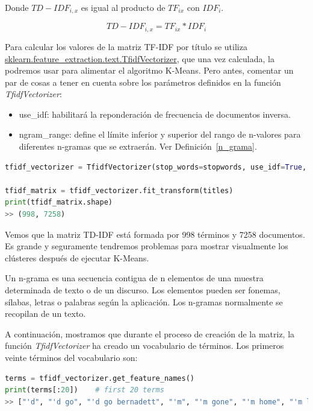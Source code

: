 \documentclass{uimppracticas}
\begin{document}
Donde $TD-IDF_{i,x}$ es igual al producto de $TF_{ix}$ con $IDF_{i}$.

\begin{equation}
	TD-IDF_{i,x} = TF_{ix} * IDF_{i}
\end{equation}

Para calcular los valores de la matriz TF-IDF por título se utiliza \href{https://scikit-learn.org/stable/modules/generated/sklearn.feature_extraction.text.TfidfVectorizer.html}{sklearn.feature\_extraction.text.TfidfVectorizer}, que una vez calculada, la podremos usar para alimentar el algoritmo K-Means. Pero antes, comentar un par de cosas a tener en cuenta sobre los parámetros definidos en la función \textit{TfidfVectorizer}:

\begin{itemize}
	\item use\_idf: habilitará la reponderación de frecuencia de documentos inversa.
	\item ngram\_range: define el límite inferior y superior del rango de n-valores para diferentes n-gramas que se extraerán. Ver Definición~\ref{n_grama}.
\end{itemize}

\begin{lstlisting}[language=python]
tfidf_vectorizer = TfidfVectorizer(stop_words=stopwords, use_idf=True, tokenizer=tokenize_and_stem, ngram_range=(1, 3))

tfidf_matrix = tfidf_vectorizer.fit_transform(titles)
print(tfidf_matrix.shape)
>> (998, 7258)
\end{lstlisting}

Vemos que la matriz TD-IDF está formada por 998 términos y 7258 documentos. Es grande y seguramente tendremos problemas para mostrar visualmente los clústeres después de ejecutar K-Means.

\begin{definition}\label{n_grama}
	Un n-grama es una secuencia contigua de n elementos de una muestra determinada de texto o de un discurso. Los elementos pueden ser fonemas, sílabas, letras o palabras según la aplicación. Los n-gramas normalmente se recopilan de un texto.
\end{definition}

A continuación, mostramos que durante el proceso de creación de la matriz, la función \textit{TfidfVectorizer} ha creado un vocabulario de términos. Los primeros veinte términos del vocabulario son:

\begin{lstlisting}[language=python]
terms = tfidf_vectorizer.get_feature_names()
print(terms[:20])    # first 20 terms
>> ["'d", "'d go", "'d go bernadett", "'m", "'m gone", "'m home", "'m lie", "'m lie tell", "'s", "'s alic", "'s alic wonderland", "'s astound", "'s astound stori", "'s autobiographi", "'s babi", "'s babi ice", "'s berlin", "'s call", "'s call cormoran", "'s childhood"]
\end{lstlisting}
\end{document}
